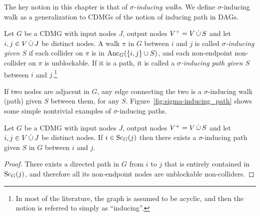The key notion in this chapter is that of \emph{$\sigma$-inducing walks}.
We define $\sigma$-inducing walk as a generalization to CDMGs of the notion of inducing path \cite{VermaPearl1990} in DAGs. %
\begin{Def}\label{def:sigma-inducing_path}
Let $G$ be a CDMG with input nodes $J$, output nodes $V^+ = V \,\dot{\cup}\, S$ and let $i,j \in V \,\dot{\cup}\, J$ be distinct nodes.
A walk $\pi$ in $G$ between $i$ and $j$ is called \emph{$\sigma$-inducing given $S$} if  each collider on $\pi$ is in $\mathrm{Anc}_{G}(\{i,j\}\cup S)$, and each non-endpoint non-collider on $\pi$ is unblockable. 
If it is a path, it is called a \emph{$\sigma$-inducing path given $S$} between $i$ and $j$.\footnote{In most of the literature, the graph is assumed to be acyclic, and then the notion is referred to simply as ``inducing''.}
\end{Def}
If two nodes are adjacent in $G$, any edge connecting the two is a $\sigma$-inducing walk (path) given $S$ between them, for any $S$.
Figure~\ref{fig:sigma-inducing_path} shows some simple nontrivial examples of $\sigma$-inducing paths.
\begin{Lem}\label{lem:sigma-inducing_path_in_scc}
Let $G$ be a CDMG with input nodes $J$, output nodes $V^+ = V \,\dot{\cup}\, S$ and let $i,j \in V \,\dot{\cup}\, J$ be distinct nodes.
If $i \in \mathrm{Sc}_G(j)$ then there exists a $\sigma$-inducing path given $S$ in $G$ between $i$ and $j$.
\end{Lem}
\begin{proof}
There exists a directed path in $G$ from $i$ to $j$ that is entirely contained in $\mathrm{Sc}_G(j)$, and therefore all its non-endpoint nodes are unblockable non-colliders.
\end{proof}

